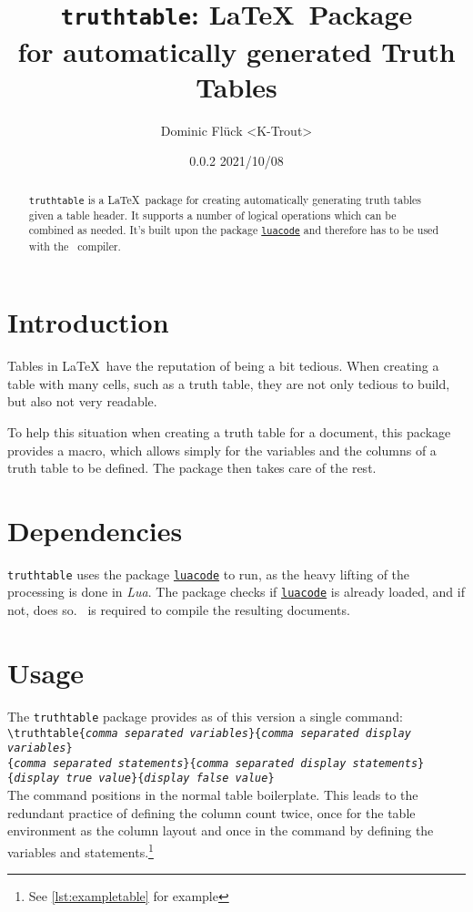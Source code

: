 \documentclass[a4paper]{article}
\title{\texttt{truthtable}\textbf{: \LaTeX\ Package\\for automatically generated Truth Tables}}
\author{Dominic Flück <K-Trout>}
\date{0.0.2 2021/10/08}
\begin{document}
\maketitle

\begin{abstract}
	\noindent \texttt{truthtable} is a \LaTeX\ package for creating automatically generating truth tables given a table header. It supports a number of logical operations which can be combined as needed. It's built upon the package \href{https://ctan.org/pkg/luacode}{\texttt{luacode}} and therefore has to be used with the \LuaLaTeX\ compiler.
\end{abstract}

\tableofcontents

\section{Introduction}
Tables in \LaTeX\ have the reputation of being a bit tedious. When creating a table with many cells, such as a truth table, they are not only tedious to build, but also not very readable.

To help this situation when creating a truth table for a document, this package provides a macro, which allows simply for the variables and the columns of a truth table to be defined. The package then takes care of the rest.

\section{Dependencies}

\texttt{truthtable} uses the package \href{https://ctan.org/pkg/luacode}{\texttt{luacode}} to run, as the heavy lifting of the processing is done in \emph{Lua}. 	The package checks if \href{https://ctan.org/pkg/luacode}{\texttt{luacode}} is already loaded, and if not, does so. \LuaLaTeX\ is required to compile the resulting documents.

\section{Usage}

The \texttt{truthtable} package provides as of this version a single command:\bigskip\\
\noindent\texttt{\textbackslash truthtable\{\emph{comma separated variables}\}\{\emph{comma separated display variables}\}\\\{\emph{comma separated statements}\}\{\emph{comma separated display statements}\}\\\{\emph{display true value}\}\{\emph{display false value}\}}
\bigskip\\
The command positions in the normal table boilerplate. This leads to the redundant practice of defining the column count twice, once for the table environment as the column layout and once in the command by defining the variables and statements.\footnote{See \autoref{lst:exampletable} for example}
\end{document}
